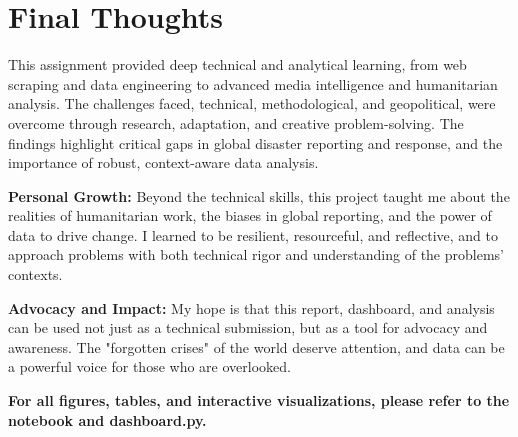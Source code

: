 \documentclass[12pt]{article}
\begin{document}
\section{Final Thoughts}
This assignment provided deep technical and analytical learning, from web scraping and data engineering to advanced media intelligence and humanitarian analysis. The challenges faced, technical, methodological, and geopolitical, were overcome through research, adaptation, and creative problem-solving. The findings highlight critical gaps in global disaster reporting and response, and the importance of robust, context-aware data analysis.

\textbf{Personal Growth:} Beyond the technical skills, this project taught me about the realities of humanitarian work, the biases in global reporting, and the power of data to drive change. I learned to be resilient, resourceful, and reflective, and to approach problems with both technical rigor and understanding of the problems' contexts.

\textbf{Advocacy and Impact:} My hope is that this report, dashboard, and analysis can be used not just as a technical submission, but as a tool for advocacy and awareness. The "forgotten crises" of the world deserve attention, and data can be a powerful voice for those who are overlooked.

\vspace{1cm}
\noindent\textbf{For all figures, tables, and interactive visualizations, please refer to the notebook and dashboard.py.}
\end{document}
